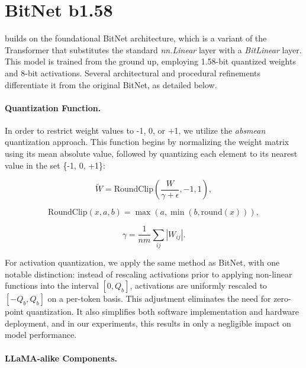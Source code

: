\section{BitNet b1.58}

 builds on the foundational BitNet architecture, which is a variant of the Transformer that substitutes the standard \emph{nn.Linear} layer with a \emph{BitLinear} layer. This model is trained from the ground up, employing 1.58-bit quantized weights and 8-bit activations. Several architectural and procedural refinements differentiate it from the original BitNet, as detailed below.

\paragraph{Quantization Function.} In order to restrict weight values to -1, 0, or +1, we utilize the \emph{absmean} quantization approach. This function begins by normalizing the weight matrix using its mean absolute value, followed by quantizing each element to its nearest value in the set \{-1, 0, +1\}:

\begin{equation}
    \widetilde{W} = \mathrm{RoundClip}(\frac{W}{\gamma + \epsilon}, -1, 1),
\end{equation}

\begin{equation}
    \mathrm{RoundClip}(x, a, b) = \max(a, \min(b, \mathrm{round}(x))),
\end{equation}

\begin{equation}
    \gamma = \frac{1}{nm}\sum_{ij} |W_{ij}|.
\end{equation}

For activation quantization, we apply the same method as BitNet, with one notable distinction: instead of rescaling activations prior to applying non-linear functions into the interval $[0, Q_b]$, activations are uniformly rescaled to $[-Q_b, Q_b]$ on a per-token basis. This adjustment eliminates the need for zero-point quantization. It also simplifies both software implementation and hardware deployment, and in our experiments, this results in only a negligible impact on model performance.

\paragraph{LLaMA-alike Components.}

